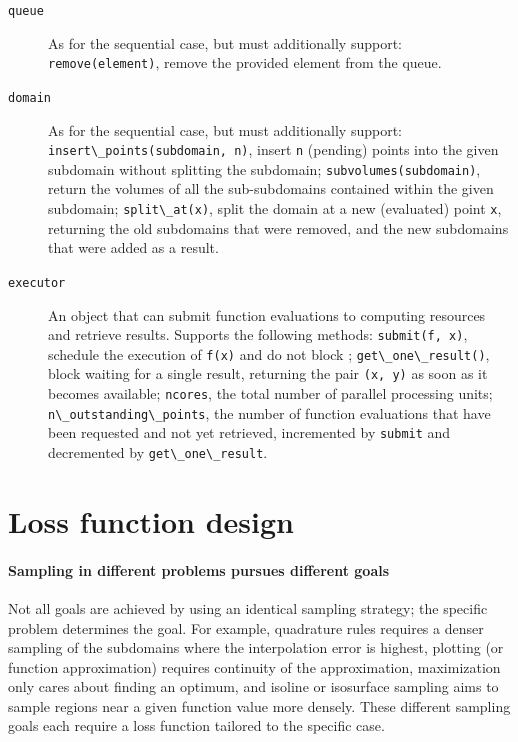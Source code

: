 \documentclass[english, twocolumn, 10pt, aps, superscriptaddress, floatfix, prb, citeautoscript]{revtex4-1}
\newcommand{\passthrough}[1]{\lstset{mathescape=false}#1\lstset{mathescape=true}}
\begin{document}
\begin{description}
\item[\texttt{queue}]
As for the sequential case, but must additionally support: \passthrough{\lstinline!remove(element)!}, remove the provided element from the queue.
\item[\texttt{domain}]
As for the sequential case, but must additionally support: \passthrough{\lstinline!insert\_points(subdomain, n)!}, insert \passthrough{\lstinline!n!} (pending) points into the given subdomain without splitting the subdomain; \passthrough{\lstinline!subvolumes(subdomain)!}, return the volumes of all the sub-subdomains contained within the given subdomain; \passthrough{\lstinline!split\_at(x)!}, split the domain at a new (evaluated) point \passthrough{\lstinline!x!}, returning the old subdomains that were removed, and the new subdomains that were added as a result.
\item[\texttt{executor}]
An object that can submit function evaluations to computing resources and retrieve results.
Supports the following methods: \passthrough{\lstinline!submit(f, x)!}, schedule the execution of \passthrough{\lstinline!f(x)!} and do not block ; \passthrough{\lstinline!get\_one\_result()!}, block waiting for a single result, returning the pair \passthrough{\lstinline!(x, y)!} as soon as it becomes available; \passthrough{\lstinline!ncores!}, the total number of parallel processing units; \passthrough{\lstinline!n\_outstanding\_points!}, the number of function evaluations that have been requested and not yet retrieved, incremented by \passthrough{\lstinline!submit!} and decremented by \passthrough{\lstinline!get\_one\_result!}.
\end{description}

\hypertarget{sec:loss}{%
\section{Loss function design}\label{sec:loss}}

\paragraph{Sampling in different problems pursues different goals}

Not all goals are achieved by using an identical sampling strategy; the specific problem determines the goal.
For example, quadrature rules requires a denser sampling of the subdomains where the interpolation error is highest, plotting (or function approximation) requires continuity of the approximation, maximization only cares about finding an optimum, and isoline or isosurface sampling aims to sample regions near a given function value more densely.
These different sampling goals each require a loss function tailored to the specific case.
\end{document}
